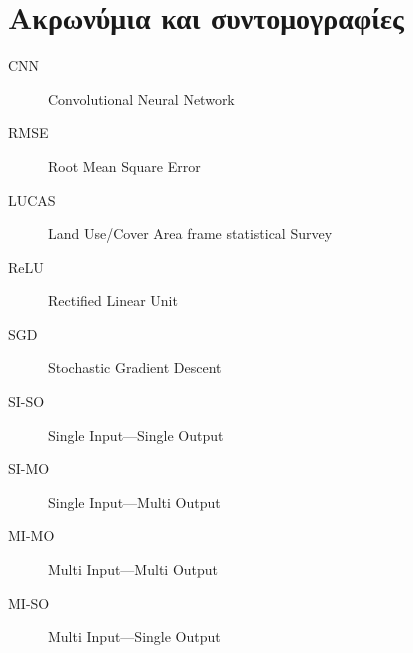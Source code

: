 \chapter{Ακρωνύμια και συντομογραφίες}

\begin{description}
    \item[CNN] Convolutional Neural Network
    \item[RMSE] Root Mean Square Error
    \item[LUCAS] Land Use/Cover Area frame statistical Survey
    \item[ReLU] Rectified Linear Unit
    \item[SGD] Stochastic Gradient Descent
    \item[SI-SO] Single Input---Single Output
    \item[SI-MO] Single Input---Multi Output
    \item[MI-MO] Multi Input---Multi Output
    \item[MI-SO] Multi Input---Single Output
    \item[] 
\end{description}
